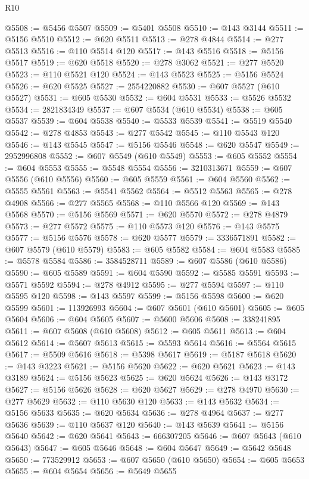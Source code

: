 \begin{lexlean}{R10}
\begin{coremodule}
@5508 := @5456 @5507
@5509 := @5401 @5508
@5510 := @143 @3144
@5511 := @5156 @5510
@5512 := @620 @5511
@5513 := @278 @4844
@5514 := @277 @5513
@5516 := @110 @5514 @120
@5517 := @143 @5516
@5518 := @5156 @5517
@5519 := @620 @5518
@5520 := @278 @3062
@5521 := @277 @5520
@5523 := @110 @5521 @120
@5524 := @143 @5523
@5525 := @5156 @5524
@5526 := @620 @5525
@5527 := 2554220882
@5530 := @607 @5527 (@610 @5527)
@5531 := @605 @5530
@5532 := @604 @5531
@5533 := @5526 @5532
@5534 := 2821834349
@5537 := @607 @5534 (@610 @5534)
@5538 := @605 @5537
@5539 := @604 @5538
@5540 := @5533 @5539
@5541 := @5519 @5540
@5542 := @278 @4853
@5543 := @277 @5542
@5545 := @110 @5543 @120
@5546 := @143 @5545
@5547 := @5156 @5546
@5548 := @620 @5547
@5549 := 2952996808
@5552 := @607 @5549 (@610 @5549)
@5553 := @605 @5552
@5554 := @604 @5553
@5555 := @5548 @5554
@5556 := 3210313671
@5559 := @607 @5556 (@610 @5556)
@5560 := @605 @5559
@5561 := @604 @5560
@5562 := @5555 @5561
@5563 := @5541 @5562
@5564 := @5512 @5563
@5565 := @278 @4908
@5566 := @277 @5565
@5568 := @110 @5566 @120
@5569 := @143 @5568
@5570 := @5156 @5569
@5571 := @620 @5570
@5572 := @278 @4879
@5573 := @277 @5572
@5575 := @110 @5573 @120
@5576 := @143 @5575
@5577 := @5156 @5576
@5578 := @620 @5577
@5579 := 3336571891
@5582 := @607 @5579 (@610 @5579)
@5583 := @605 @5582
@5584 := @604 @5583
@5585 := @5578 @5584
@5586 := 3584528711
@5589 := @607 @5586 (@610 @5586)
@5590 := @605 @5589
@5591 := @604 @5590
@5592 := @5585 @5591
@5593 := @5571 @5592
@5594 := @278 @4912
@5595 := @277 @5594
@5597 := @110 @5595 @120
@5598 := @143 @5597
@5599 := @5156 @5598
@5600 := @620 @5599
@5601 := 113926993
@5604 := @607 @5601 (@610 @5601)
@5605 := @605 @5604
@5606 := @604 @5605
@5607 := @5600 @5606
@5608 := 338241895
@5611 := @607 @5608 (@610 @5608)
@5612 := @605 @5611
@5613 := @604 @5612
@5614 := @5607 @5613
@5615 := @5593 @5614
@5616 := @5564 @5615
@5617 := @5509 @5616
@5618 := @5398 @5617
@5619 := @5187 @5618
@5620 := @143 @3223
@5621 := @5156 @5620
@5622 := @620 @5621
@5623 := @143 @3189
@5624 := @5156 @5623
@5625 := @620 @5624
@5626 := @143 @3172
@5627 := @5156 @5626
@5628 := @620 @5627
@5629 := @278 @4970
@5630 := @277 @5629
@5632 := @110 @5630 @120
@5633 := @143 @5632
@5634 := @5156 @5633
@5635 := @620 @5634
@5636 := @278 @4964
@5637 := @277 @5636
@5639 := @110 @5637 @120
@5640 := @143 @5639
@5641 := @5156 @5640
@5642 := @620 @5641
@5643 := 666307205
@5646 := @607 @5643 (@610 @5643)
@5647 := @605 @5646
@5648 := @604 @5647
@5649 := @5642 @5648
@5650 := 773529912
@5653 := @607 @5650 (@610 @5650)
@5654 := @605 @5653
@5655 := @604 @5654
@5656 := @5649 @5655

\end{coremodule}
\end{lexlean}
